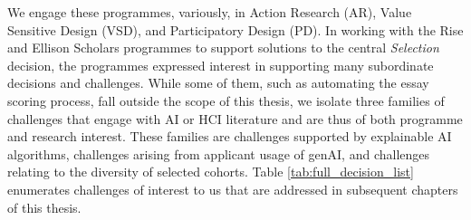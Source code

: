 We engage these programmes, variously, in Action Research (AR), Value Sensitive Design (VSD), and Participatory Design (PD). In working with the Rise and Ellison Scholars programmes to support solutions to the central \emph{Selection} decision, the programmes expressed interest in supporting many subordinate decisions and challenges. While some of them, such as automating the essay scoring process, fall outside the scope of this thesis, we isolate three families of challenges that engage with AI or HCI literature and are thus of both programme and research interest. These families are challenges supported by explainable AI algorithms, challenges arising from applicant usage of genAI, and challenges relating to the diversity of selected cohorts. Table \ref{tab:full_decision_list} enumerates challenges of interest to us that are addressed in subsequent chapters of this thesis. 